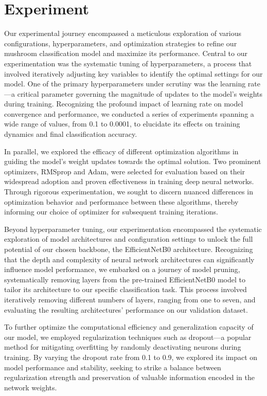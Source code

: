 \section{Experiment}
Our experimental journey encompassed a meticulous exploration of various configurations, hyperparameters, and optimization strategies to refine our mushroom classification model and maximize its performance. Central to our experimentation was the systematic tuning of hyperparameters, a process that involved iteratively adjusting key variables to identify the optimal settings for our model. One of the primary hyperparameters under scrutiny was the learning rate—a critical parameter governing the magnitude of updates to the model's weights during training. Recognizing the profound impact of learning rate on model convergence and performance, we conducted a series of experiments spanning a wide range of values, from 0.1 to 0.0001, to elucidate its effects on training dynamics and final classification accuracy.

In parallel, we explored the efficacy of different optimization algorithms in guiding the model's weight updates towards the optimal solution. Two prominent optimizers, RMSprop and Adam, were selected for evaluation based on their widespread adoption and proven effectiveness in training deep neural networks. Through rigorous experimentation, we sought to discern nuanced differences in optimization behavior and performance between these algorithms, thereby informing our choice of optimizer for subsequent training iterations.

Beyond hyperparameter tuning, our experimentation encompassed the systematic exploration of model architectures and configuration settings to unlock the full potential of our chosen backbone, the EfficientNetB0 architecture. Recognizing that the depth and complexity of neural network architectures can significantly influence model performance, we embarked on a journey of model pruning, systematically removing layers from the pre-trained EfficientNetB0 model to tailor its architecture to our specific classification task. This process involved iteratively removing different numbers of layers, ranging from one to seven, and evaluating the resulting architectures' performance on our validation dataset.

To further optimize the computational efficiency and generalization capacity of our model, we employed regularization techniques such as dropout—a popular method for mitigating overfitting by randomly deactivating neurons during training. By varying the dropout rate from 0.1 to 0.9, we explored its impact on model performance and stability, seeking to strike a balance between regularization strength and preservation of valuable information encoded in the network weights.

